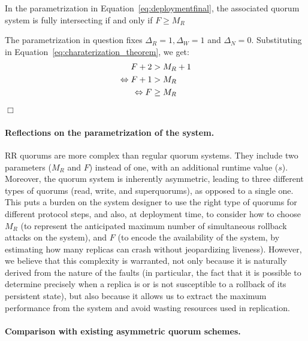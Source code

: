 \begin{corollary}
    In the parametrization in
    Equation~\ref{eq:deploymentfinal}, the associated quorum
    system is fully intersecting if and only if $F \geq M_R$
\end{corollary}
\begin{dem}
    The parametrization in question fixes $\Delta_R = 1,
    \Delta_W = 1$ and $\Delta_N = 0$. Substituting in
    Equation~\ref{eq:charaterization_theorem}, we get:
    \begin{align*}
        F + 2 &> M_R + 1 \\
        \Leftrightarrow F + 1 &> M_R \\
        \Leftrightarrow F &\geq M_R
    \end{align*}
    \hfill\ensuremath{\Box}\vspace{2em}
\end{dem}

\paragraph{Reflections on the parametrization of the system.}
\ac{RR} quorums are more complex than regular
quorum systems. They include two parameters ($M_R$ and $F$) instead of
one, with an additional runtime value ($s$). Moreover, the quorum
system is inherently asymmetric, leading to three different types of
quorums (read, write, and superquorums), as opposed to a single one.
This puts a burden on the system designer to use the right type of quorums for
different protocol steps, and also, at deployment time, to consider how to
choose $M_R$ (to represent the anticipated maximum number of simultaneous rollback
attacks on the system), and $F$
(to encode the availability of the system, by estimating how many replicas
can crash without jeopardizing liveness).
%
However, we believe that this complexity is warranted, not only
because it is naturally derived from the nature of the faults (in
particular, the fact that it is possible to determine precisely when a
replica is or is not susceptible to a rollback of its persistent
state), but also because it allows us to extract the maximum
performance from the system and avoid wasting resources used in
replication.

\paragraph{Comparison with existing asymmetric quorum schemes.}

